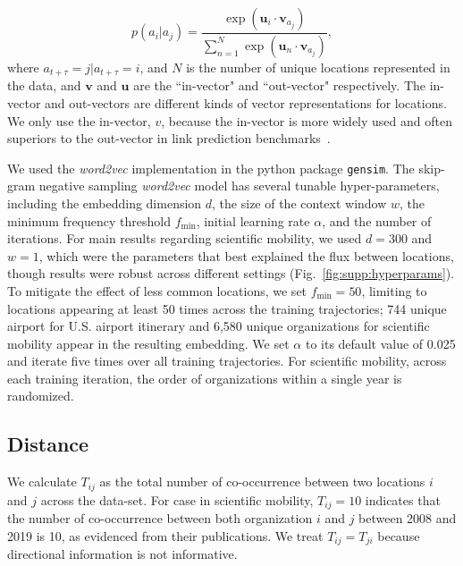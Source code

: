 \documentclass[12pt]{article} %
\begin{document}
%
%
\begin{equation}
p(a_{i} \vert a_{j}) = \frac{\exp(\bm{u}_{i} \cdot \bm{v}_{a_{j}})}{\sum_{n=1}^N \exp(\bm{u}_{n} \cdot \bm{v}_{a_{j}})},
\end{equation}
where $a_{t+\tau} = j \vert a_{t+\tau} = i$, and $N$ is the number of unique locations represented in the data, and $\bm{v}$ and $\bm{u}$ are the ``in-vector" and ``out-vector" respectively.
The in-vector and out-vectors are different kinds of vector representations for locations. We only use the in-vector, $v$, because the in-vector is more widely used and often superiors to the out-vector in link prediction benchmarks~\autocite{linzhuo2020hyperbolic, tshitoyan2019mat2vec, garg2018gender, kozlowski2018geometry, hamilton2016diachronic, le2014doc2vec, nakandala2017gendered}.


We used the \textit{word2vec}  implementation in the python package \texttt{gensim}. 
The skip-gram negative sampling  \textit{word2vec} model has several tunable hyper-parameters, including the embedding dimension $d$, the size of the context window $w$, the minimum frequency threshold $f_{\min}$, initial learning rate $\alpha$, and the number of iterations.
For main results regarding scientific mobility, we used $d=300$ and $w=1$, which were the parameters that best explained the flux between locations, though results were robust across different settings (Fig.~\ref{fig:supp:hyperparams}).
To mitigate the effect of less common locations, we set $f_{\min} = 50$, limiting to locations appearing at least 50 times across the training trajectories;
744 unique airport for U.S. airport itinerary  and 6,580 unique organizations for scientific mobility appear in the resulting embedding.
We set $\alpha$ to its default value of 0.025 and iterate five times over all training trajectories.
For scientific mobility, across each training iteration, the order of organizations within a single year is randomized. 


%
%
\subsection*{Distance}
We calculate $T_{ij}$ as the total number of co-occurrence between two locations $i$ and $j$ across the data-set.
For case in scientific mobility, $T_{ij} = 10$ indicates that the number of co-occurrence between both organization $i$ and $j$ between 2008 and 2019 is 10, as evidenced from their publications.
We treat $T_{ij} = T_{ji}$ because directional information is not informative.
\end{document}
